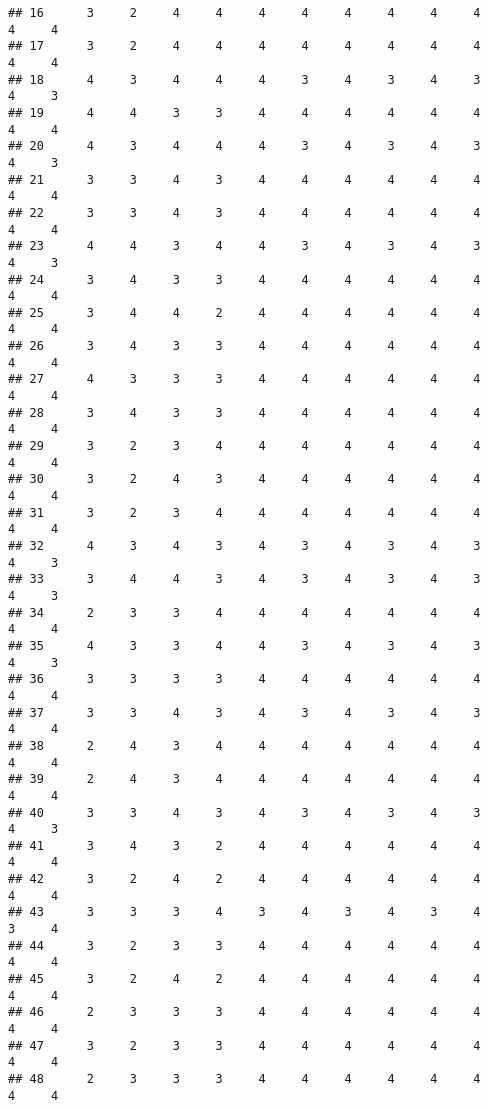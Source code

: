 \documentclass[
]{article}
\begin{document}
\begin{verbatim}
## 16      3     2     4     4     4     4     4     4     4     4     4     4
## 17      3     2     4     4     4     4     4     4     4     4     4     4
## 18      4     3     4     4     4     3     4     3     4     3     4     3
## 19      4     4     3     3     4     4     4     4     4     4     4     4
## 20      4     3     4     4     4     3     4     3     4     3     4     3
## 21      3     3     4     3     4     4     4     4     4     4     4     4
## 22      3     3     4     3     4     4     4     4     4     4     4     4
## 23      4     4     3     4     4     3     4     3     4     3     4     3
## 24      3     4     3     3     4     4     4     4     4     4     4     4
## 25      3     4     4     2     4     4     4     4     4     4     4     4
## 26      3     4     3     3     4     4     4     4     4     4     4     4
## 27      4     3     3     3     4     4     4     4     4     4     4     4
## 28      3     4     3     3     4     4     4     4     4     4     4     4
## 29      3     2     3     4     4     4     4     4     4     4     4     4
## 30      3     2     4     3     4     4     4     4     4     4     4     4
## 31      3     2     3     4     4     4     4     4     4     4     4     4
## 32      4     3     4     3     4     3     4     3     4     3     4     3
## 33      3     4     4     3     4     3     4     3     4     3     4     3
## 34      2     3     3     4     4     4     4     4     4     4     4     4
## 35      4     3     3     4     4     3     4     3     4     3     4     3
## 36      3     3     3     3     4     4     4     4     4     4     4     4
## 37      3     3     4     3     4     3     4     3     4     3     4     4
## 38      2     4     3     4     4     4     4     4     4     4     4     4
## 39      2     4     3     4     4     4     4     4     4     4     4     4
## 40      3     3     4     3     4     3     4     3     4     3     4     3
## 41      3     4     3     2     4     4     4     4     4     4     4     4
## 42      3     2     4     2     4     4     4     4     4     4     4     4
## 43      3     3     3     4     3     4     3     4     3     4     3     4
## 44      3     2     3     3     4     4     4     4     4     4     4     4
## 45      3     2     4     2     4     4     4     4     4     4     4     4
## 46      2     3     3     3     4     4     4     4     4     4     4     4
## 47      3     2     3     3     4     4     4     4     4     4     4     4
## 48      2     3     3     3     4     4     4     4     4     4     4     4

\end{verbatim}
\end{document}
